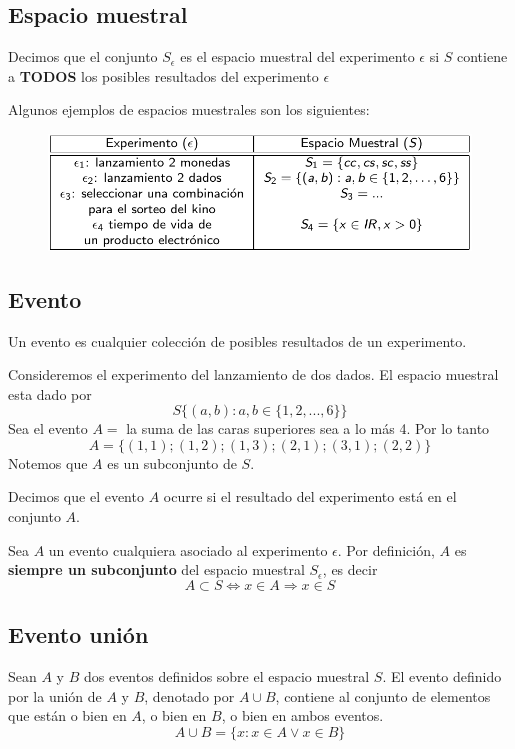 \documentclass[12pt,twocolumn,a4paper]{report}
\begin{document}
\subsection*{Espacio muestral}
Decimos que el conjunto $S_\epsilon$ es el espacio muestral del experimento $\epsilon$ si $S$ contiene a \textbf{TODOS} los posibles resultados del experimento $\epsilon$

Algunos ejemplos de espacios muestrales son los siguientes:
\begin{figure}[H]
\centering
\includegraphics[scale=0.3]{graficos/8.png}
\end{figure}

\subsection*{Evento}
Un evento es cualquier colección de posibles resultados de un experimento. 

Consideremos el experimento del lanzamiento de dos dados. El espacio muestral esta dado por 
$$ 
S\{(a,b): a,b \in \{1,2,...,6\}\}
$$
Sea el evento $A =$ la suma de las caras superiores sea a lo más 4. Por lo tanto 
$$
A = \{(1,1); (1,2); (1,3); (2,1); (3,1); (2,2)\}
$$
Notemos que $A$ es un subconjunto de $S$.

Decimos que el evento $A$ ocurre si el resultado del experimento está en el conjunto $A$. 

Sea $A$ un evento cualquiera asociado al experimento $\epsilon$. Por definición, $A$ es \textbf{siempre un subconjunto} del espacio muestral $S_\epsilon$, es decir
$$
A \subset S \Longleftrightarrow x \in A \Rightarrow x \in S
$$

\subsection*{Evento unión}
Sean $A$ y $B$ dos eventos definidos sobre el espacio muestral $S$. El evento definido por la unión de $A$ y $B$, denotado por $A \cup B$, contiene al conjunto de elementos que están o bien en $A$, o bien en $B$, o bien en ambos eventos. 
$$
A \cup B = \{x: x \in A \vee x \in B \}
$$
\end{document}
